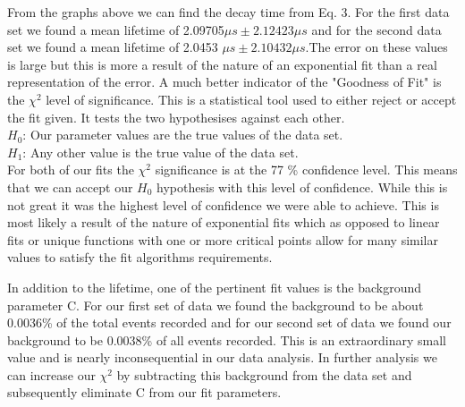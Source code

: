 From the graphs above we can find the decay time from Eq. 3. For the first data set we found a mean lifetime of 2.09705$\mu s \pm 2.12423 \mu s$ and for the second data set we found a mean lifetime of 2.0453 $
\mu s \pm 2.10432 \mu s$.The error on these values is large but this is more a result of the nature of an exponential fit than a real representation of the error.  A much better indicator of the "Goodness of Fit" is the $\chi^2$ level of significance.  This is a statistical tool used to   either reject or accept the fit given. It tests the two hypothesises against each other.\\
\indent \indent $H_0 $: Our parameter values are the true values of the data set.\\
\indent \indent $H_1$: Any other value is the true value of the data set.\\
 For both of our fits the $\chi^2$ significance is at the 77 \% confidence level.  This means that we can accept our $H_0$ hypothesis with this level of confidence.  While this is not great it was the highest level of confidence we were able to achieve.  This is most likely a result of the nature of exponential fits which as opposed to linear fits or unique functions with one or more critical points allow for many similar values to satisfy the fit algorithms requirements.
 
\indent \indent In addition to the lifetime, one of the pertinent fit values is the background parameter C. For our first set of data we found the background to be about 0.0036\% of the total events recorded and for our second set of data we found our background to be 0.0038\% of all events recorded. This is an extraordinary small value and is nearly inconsequential in our data analysis. In further analysis we can increase our $\chi^2$ by subtracting this background from the data set and subsequently eliminate C from our fit parameters. 

